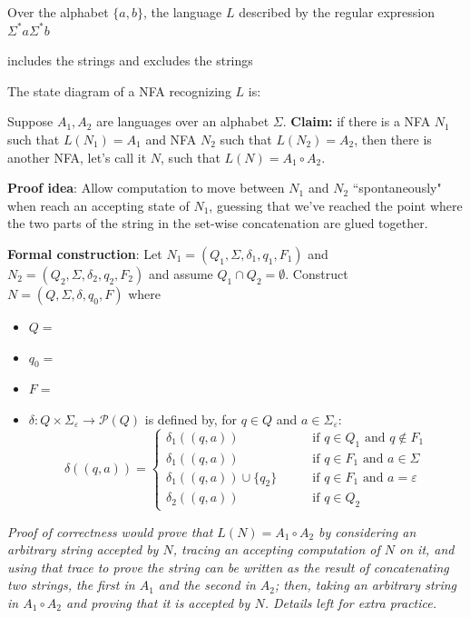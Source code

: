 \documentclass[12pt, oneside]{article}
\begin{document}
\newpage
Over the alphabet $\{a,b\}$, the language $L$ described by the regular expression 
$\Sigma^* a \Sigma^* b$

 includes the strings \phantom{space for strings here} and excludes the strings 


The state diagram of a NFA recognizing $L$ is:

\vspace{100pt}

Suppose $A_1, A_2$ are languages over an alphabet $\Sigma$.
{\bf Claim:} if there is a NFA $N_1$ such that $L(N_1) = A_1$ and 
NFA $N_2$ such that $L(N_2) = A_2$, then there is another NFA, let's call it $N$, such that 
$L(N) = A_1 \circ A_2$.

{\bf Proof idea}: Allow computation to move between $N_1$ and $N_2$ ``spontaneously" when reach an accepting state of 
$N_1$, guessing that we've reached the point where the two parts of the string in the set-wise concatenation 
are glued together.


{\bf Formal construction}: Let 
$N_1 = (Q_1, \Sigma, \delta_1, q_1, F_1)$ and $N_2 = (Q_2, \Sigma, \delta_2,q_2, F_2)$
and assume $Q_1 \cap Q_2 = \emptyset$.
Construct $N = (Q, \Sigma, \delta, q_0, F)$ where
\begin{itemize}
    \item $Q = $
    \item $q_0 = $
    \item $F = $
    \item $\delta: Q \times \Sigma_\varepsilon \to \mathcal{P}(Q)$ is defined by, for $q \in Q$ and $a \in \Sigma_{\varepsilon}$:
        \[
            \delta((q,a))=\begin{cases}  
                \delta_1 ((q,a)) &\qquad\text{if } q\in Q_1 \textrm{ and } q \notin F_1\\ 
                \delta_1 ((q,a)) &\qquad\text{if } q\in F_1 \textrm{ and } a \in \Sigma\\ 
                \delta_1 ((q,a)) \cup \{q_2\} &\qquad\text{if } q\in F_1 \textrm{ and } a = \varepsilon\\ 
                \delta_2 ((q,a)) &\qquad\text{if } q\in Q_2
            \end{cases}
        \]
\end{itemize}

\vfill

{\it Proof of correctness would prove that $L(N) = A_1 \circ A_2$ by considering
an arbitrary string accepted by $N$, tracing an accepting computation of $N$ on it, and using 
that trace to prove the string can be written as the result of concatenating two strings, 
the first in $A_1$ and the second in $A_2$; then, taking an arbitrary 
string in $A_1 \circ A_2$ and proving that it is accepted by $N$. Details left for extra practice.}
\end{document}
